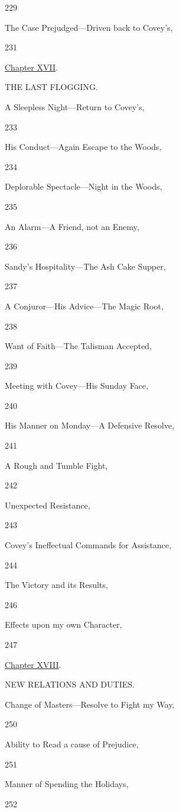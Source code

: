 229

The Case Prejudged---Driven back to Covey's,

231

\href{/wiki/My_Bondage_and_My_Freedom_(1855)/Chapter_XVII}{Chapter
XVII}.

THE LAST FLOGGING.

A Sleepless Night---Return to Covey's,

233

His Conduct---Again Escape to the Woods,

234

Deplorable Spectacle---Night in the Woods,

235

An Alarm---A Friend, not an Enemy,

236

Sandy's Hospitality---The Ash Cake Supper,

237

A Conjuror---His Advice---The Magic Root,

238

Want of Faith---The Talisman Accepted,

239

Meeting with Covey---His Sunday Face,

240

His Manner on Monday---A Defensive Resolve,

241

A Rough and Tumble Fight,

242

Unexpected Resistance,

243

Covey's Ineffectual Commands for Assistance,

244

The Victory and its Results,

246

Effects upon my own Character,

247

\href{/wiki/My_Bondage_and_My_Freedom_(1855)/Chapter_XVIII}{Chapter
XVIII}.

NEW RELATIONS AND DUTIES.

Change of Masters---Resolve to Fight my Way,

250

Ability to Read a cause of Prejudice,

251

Manner of Spending the Holidays,

252

